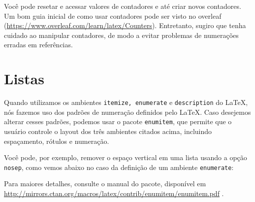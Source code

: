 Você pode resetar e acessar valores de contadores e até criar novos contadores. Um bom guia inicial de como usar contadores pode ser visto no \gls{overleaf} (\url{https://www.overleaf.com/learn/latex/Counters}). Entretanto, sugiro que tenha cuidado ao manipular contadores, de modo a evitar problemas de numerações erradas em referências.

\section{Listas}

Quando utilizamos os ambientes \texttt{itemize, enumerate} e  \texttt{description} do \LaTeX{}, nós fazemos uso dos padrões de numeração definidos pelo \LaTeX{}. Caso desejemos alterar cesses padrões, podemos usar o pacote \texttt{enumitem}, que permite que o usuário controle o layout dos três ambientes citados acima, incluindo espaçamento, rótulos e numeração.

Você pode, por exemplo, remover o espaço vertical em uma lista usando a opção \texttt{nosep}, como vemos abaixo no caso da definição de um ambiente \texttt{enumerate}: 


Para maiores detalhes, consulte o manual do pacote, disponível em
\url{http://mirrors.ctan.org/macros/latex/contrib/enumitem/enumitem.pdf} \parencite{enumitem}.
